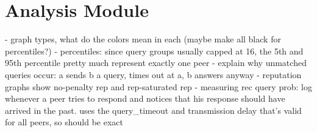 \section{Analysis Module}
- graph types, what do the colors mean in each (maybe make all black for
  percentiles?)
- percentiles: since query groups usually capped at 16, the 5th and 95th
  percentile pretty much represent exactly one peer
- explain why unmatched queries occur: a sends b a query, times out at a, b
  answers anyway
- reputation graphs show no-penalty rep and rep-saturated rep
- measuring rec query prob: log whenever a peer tries to respond and notices
  that his response should have arrived in the past. uses the query\_timeout
  and transmission delay that's valid for all peers, so should be exact
